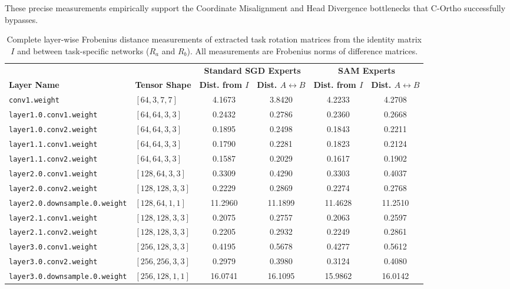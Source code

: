 \documentclass{article}
\begin{document}
These precise measurements empirically support the Coordinate Misalignment and Head Divergence bottlenecks that C-Ortho successfully bypasses.

\begin{table}[h]
\caption{Complete layer-wise Frobenius distance measurements of extracted task rotation matrices from the identity matrix $I$ and between task-specific networks ($R_a$ and $R_b$). All measurements are Frobenius norms of difference matrices.}
\label{tab:layer_details}
\centering
\begin{tabular}{llcccc}
\toprule
 & & \multicolumn{2}{c}{\textbf{Standard SGD Experts}} & \multicolumn{2}{c}{\textbf{SAM Experts}} \\
\cmidrule(r){3-4} \cmidrule(l){5-6}
\textbf{Layer Name} & \textbf{Tensor Shape} & \textbf{Dist. from $I$} & \textbf{Dist. $A \leftrightarrow B$} & \textbf{Dist. from $I$} & \textbf{Dist. $A \leftrightarrow B$} \\
\midrule
\texttt{conv1.weight} & $[64, 3, 7, 7]$ & 4.1673 & 3.8420 & 4.2233 & 4.2708 \\
\texttt{layer1.0.conv1.weight} & $[64, 64, 3, 3]$ & 0.2432 & 0.2786 & 0.2360 & 0.2668 \\
\texttt{layer1.0.conv2.weight} & $[64, 64, 3, 3]$ & 0.1895 & 0.2498 & 0.1843 & 0.2211 \\
\texttt{layer1.1.conv1.weight} & $[64, 64, 3, 3]$ & 0.1790 & 0.2281 & 0.1823 & 0.2124 \\
\texttt{layer1.1.conv2.weight} & $[64, 64, 3, 3]$ & 0.1587 & 0.2029 & 0.1617 & 0.1902 \\
\texttt{layer2.0.conv1.weight} & $[128, 64, 3, 3]$ & 0.3309 & 0.4290 & 0.3303 & 0.4037 \\
\texttt{layer2.0.conv2.weight} & $[128, 128, 3, 3]$ & 0.2229 & 0.2869 & 0.2274 & 0.2768 \\
\texttt{layer2.0.downsample.0.weight} & $[128, 64, 1, 1]$ & 11.2960 & 11.1899 & 11.4628 & 11.2510 \\
\texttt{layer2.1.conv1.weight} & $[128, 128, 3, 3]$ & 0.2075 & 0.2757 & 0.2063 & 0.2597 \\
\texttt{layer2.1.conv2.weight} & $[128, 128, 3, 3]$ & 0.2205 & 0.2932 & 0.2249 & 0.2861 \\
\texttt{layer3.0.conv1.weight} & $[256, 128, 3, 3]$ & 0.4195 & 0.5678 & 0.4277 & 0.5612 \\
\texttt{layer3.0.conv2.weight} & $[256, 256, 3, 3]$ & 0.2979 & 0.3980 & 0.3124 & 0.4080 \\
\texttt{layer3.0.downsample.0.weight} & $[256, 128, 1, 1]$ & 16.0741 & 16.1095 & 15.9862 & 16.0142 \\

\end{tabular}
\end{table}
\end{document}
